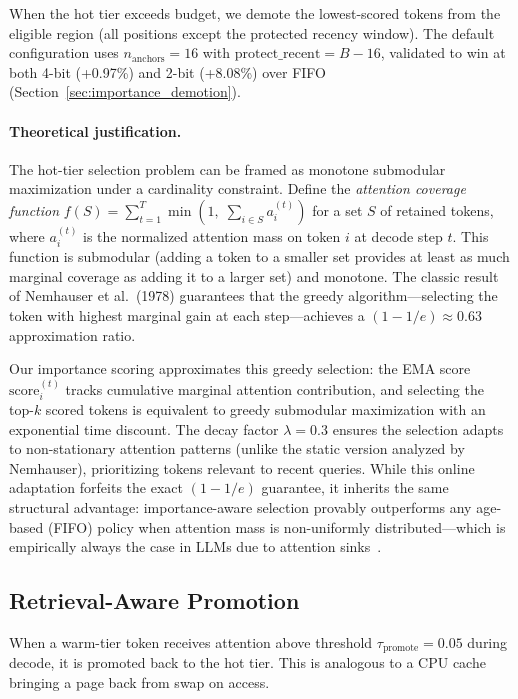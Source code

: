 \documentclass[11pt,a4paper]{article}
\begin{document}
When the hot tier exceeds budget, we demote the lowest-scored tokens from the eligible region (all positions except the protected recency window). The default configuration uses $n_{\text{anchors}} = 16$ with $\text{protect\_recent} = B - 16$, validated to win at both 4-bit (+0.97\%) and 2-bit (+8.08\%) over FIFO (Section~\ref{sec:importance_demotion}).

\paragraph{Theoretical justification.}
The hot-tier selection problem can be framed as monotone submodular maximization under a cardinality constraint. Define the \textit{attention coverage function} $f(S) = \sum_{t=1}^{T} \min\left(1,\; \sum_{i \in S} a_{i}^{(t)}\right)$ for a set $S$ of retained tokens, where $a_i^{(t)}$ is the normalized attention mass on token $i$ at decode step $t$. This function is submodular (adding a token to a smaller set provides at least as much marginal coverage as adding it to a larger set) and monotone. The classic result of Nemhauser et al.~(1978) guarantees that the greedy algorithm---selecting the token with highest marginal gain at each step---achieves a $(1 - 1/e) \approx 0.63$ approximation ratio.

Our importance scoring approximates this greedy selection: the EMA score $\text{score}_i^{(t)}$ tracks cumulative marginal attention contribution, and selecting the top-$k$ scored tokens is equivalent to greedy submodular maximization with an exponential time discount. The decay factor $\lambda = 0.3$ ensures the selection adapts to non-stationary attention patterns (unlike the static version analyzed by Nemhauser), prioritizing tokens relevant to recent queries. While this online adaptation forfeits the exact $(1-1/e)$ guarantee, it inherits the same structural advantage: importance-aware selection provably outperforms any age-based (FIFO) policy when attention mass is non-uniformly distributed---which is empirically always the case in LLMs due to attention sinks~\cite{streamingllm}.

\subsection{Retrieval-Aware Promotion}
\label{sec:promotion}

When a warm-tier token receives attention above threshold $\tau_{\text{promote}} = 0.05$ during decode, it is promoted back to the hot tier. This is analogous to a CPU cache bringing a page back from swap on access.
\end{document}
